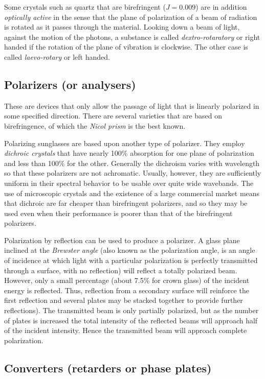 Some crystals such as quartz that are birefringent ($J=0.009$) are in addition {\it optically active} in the sense that the plane of polarization of a beam of radiation is
rotated as it passes through the material. Looking down a beam of light, against the motion of the photons, a substance is called {\it dextro-rotaratory} or right handed 
if the rotation of the plane of vibration is clockwise. The other case is called {\it
laevo-rotary} or left handed. 

\subsection{Polarizers (or analysers)}

These are devices that only allow the passage of light that is linearly polarized in some
specified direction. There are several varieties that are based on birefringence, of which
the {\it Nicol prism} is the best known.

Polarizing sunglasses are based upon another type of polarizer. They employ {\it dichroic crystals} that have nearly 100\% absorption for one plane of polarization and less than 100\% for the other. Generally the dichroism varies with wavelength so that these polarizers are not achromatic. Usually, however, they are sufficiently uniform in their spectral behavior to be usable over quite wide wavebands. The use of microscopic crystals and the existence of a large commercial market means that dichroic are far cheaper than birefringent polarizers, and so they may be used even when their performance is poorer than that of the birefringent polarizers.

Polarization by reflection can be used to produce a polarizer. A glass plane inclined at the {\it Brewster angle} (also known as the polarization angle, is an angle of incidence at which light with a particular polarization is perfectly transmitted through a surface, with no reflection) will reflect a totally polarized beam. However, only a small percentage (about 7.5\% for crown glass) of the incident energy is reflected. Thus, reflection from a secondary surface will reinforce the first reflection and several plates may be stacked together to provide further reflections). The transmitted beam is only partially polarized, but as the number of plates is increased the total intensity of the reflected beams will approach half of the incident intensity. Hence the transmitted beam will approach complete polarization. 

\subsection{Converters (retarders or phase plates)}

